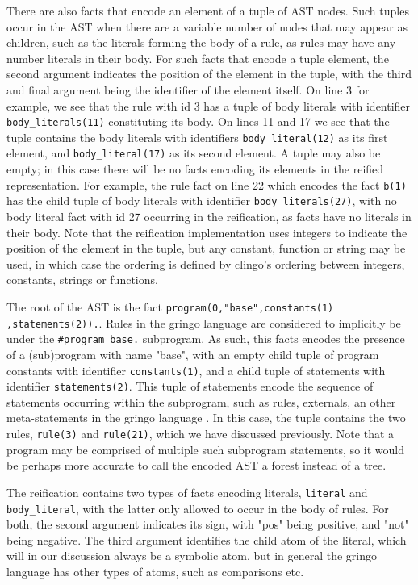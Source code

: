 There are also facts that encode an element of a tuple of AST
nodes. Such tuples occur in the AST when there are a variable number
of nodes that may appear as children, such as the literals forming the
body of a rule, as rules may have any number literals in their
body. For such facts that encode a tuple element, the second argument
indicates the position of the element in the tuple, with the third and
final argument being the identifier of the element itself. On line 3
for example, we see that the rule with id 3 has a tuple of body
literals with identifier \texttt{body\_literals(11)} constituting its
body. On lines 11 and 17 we see that the tuple contains the body
literals with identifiers \texttt{body\_literal(12)} as its first
element, and \texttt{body\_literal(17)} as its second element.  A
tuple may also be empty; in this case there will be no facts encoding
its elements in the reified representation. For example, the rule
fact on line 22 which encodes the fact \texttt{b(1)} has the child
tuple of body literals with identifier \texttt{body\_literals(27)},
with no body literal fact with id 27 occurring in the reification, as
facts have no literals in their body. Note that the reification
implementation uses integers to indicate the position of the element
in the tuple, but any constant, function or string may be used, in
which case the ordering is defined by clingo's ordering between
integers, constants, strings or functions.

The root of the AST is the fact
\texttt{program(0,"base",constants(1)} \texttt{,statements(2)).}. Rules in the
gringo language are considered to implicitly be under the
\texttt{\#program base.} subprogram\cite{karoscwa21a}. As such, this
facts encodes the presence of a (sub)program with name "base", with an
empty child tuple of program constants with identifier
\texttt{constants(1)}, and a child tuple of statements with identifier
\texttt{statements(2)}. This tuple of statements encode the sequence
of statements occurring within the subprogram, such as rules,
externals, an other meta-statements in the gringo language
\cite{PotasscoUserGuide19}. In this case, the tuple contains the two
rules, \texttt{rule(3)} and \texttt{rule(21)}, which we have discussed
previously. Note that a program may be comprised of multiple such
subprogram statements, so it would be perhaps more accurate to call
the encoded AST a forest instead of a tree.

The reification contains two types of facts encoding literals,
\texttt{literal} and \texttt{body\_literal}, with the latter only
allowed to occur in the body of rules. For both, the second argument
indicates its sign, with "pos" being positive, and "not" being
negative. The third argument identifies the child atom of the literal,
which will in our discussion always be a symbolic atom, but in general
the gringo language has other types of atoms, such as comparisons etc.


